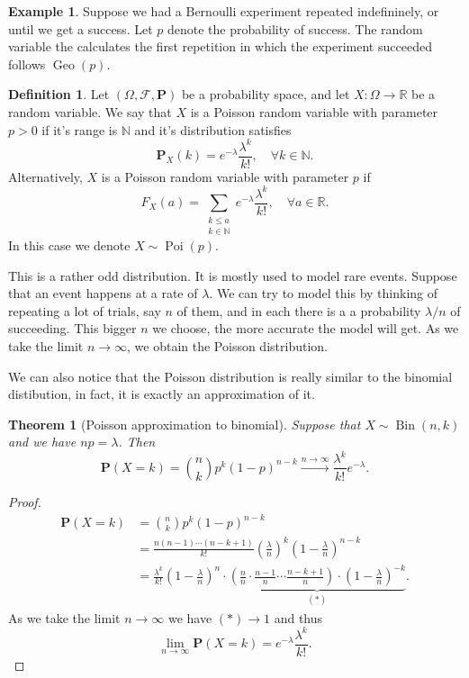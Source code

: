 \documentclass[11pt,a4paper]{article}
\theoremstyle{definition}
\newtheorem{definition}{Definition}[section]
\newtheorem{example}{Example}[section]
\theoremstyle{plain}
\newtheorem{theorem}{Theorem}[section]
\DeclareMathOperator{\Bin}{Bin}
\DeclareMathOperator{\Geo}{Geo}
\DeclareMathOperator{\Poi}{Poi}
\newcommand{\N}{\mathbb{N}}
\newcommand{\R}{\mathbb{R}}
\begin{document}
  \begin{example}
    Suppose we had a Bernoulli experiment repeated indefininely, or until
    we get a success. Let $p$ denote the probability of success.
    The random variable the calculates the first repetition in which the
    experiment succeeded follows $\Geo(p)$.
  \end{example}

  \begin{definition}
    Let $(\Omega ,\mathcal F, \mathbf P)$ be a probability space,
    and let $X \colon \Omega \to \R$ be a random variable.
    We say that $X$ is a Poisson random variable with parameter
    $p > 0$ if it's range is $\N$ and it's distribution satisfies
    \[
      \mathbf P_X(k) = e^{-\lambda} \frac{\lambda^k}{k!}, \quad 
      \forall k \in \N.
    \]
    Alternatively, $X$ is a Poisson random variable with parameter
    $p$ if
    \[
      F_X(a) = \sum_{\substack{k \le a \\ k \in \N}}
      e^{-\lambda} \frac{\lambda^k}{k!}, \quad \forall a \in \R.
    \]
    In this case we denote $X \sim \Poi(p)$.
  \end{definition}
  
  This is a rather odd distribution. It is mostly used to model rare events.
  Suppose that an event happens at a rate of $\lambda$.
  We can try to model this by thinking of repeating a lot of trials,
  say $n$ of them, and in each there is a a probability $\lambda / n$ of 
  succeeding. This bigger $n$ we choose, the more accurate the model will get.
  As we take the limit $n \to \infty$, we obtain the Poisson distribution.
  
  We can also notice that the Poisson distribution is really similar to
  the binomial distibution, in fact, it is exactly an approximation of it.

  \begin{theorem}[Poisson approximation to binomial]
    Suppose that $X \sim \Bin(n,k)$ and we have
    $np = \lambda$. Then
    \[
      \mathbf P(X = k) = 
      \binom{n}{k} p^{k} (1-p)^{n-k} \xrightarrow{n\to\infty}
      \frac{\lambda^{k}}{k!} e^{-\lambda}.
    \]
  \end{theorem}
  \begin{proof}
    \begin{align*}
      \mathbf {P}(X = k) &= 
      {\binom{n}{k}}p^{k}(1 - p)^{n - k} \\ &= 
      {\frac{n(n - 1) \cdots (n - k + 1)}{k!}} 
      \left(\frac{\lambda}{n}\right)^k
      \left(1 - {\frac{\lambda}{n}}\right)^{n-k} \\ &= 
      \frac{\lambda^{k}}{k!} \left(1-{\frac{\lambda}{n}}\right)^{n} \cdot
      \underbrace{
      \left( {\frac{n}{n}} \cdot 
      {\frac{n - 1}{n}} \cdots {\frac{n - k + 1}{n}} \right) \cdot 
      \left(1 - {\frac{\lambda}{n}}\right)^{-k}}_{(*)}.
    \end{align*}
    As we take the limit $n \to \infty$ we have $(*) \to 1$ and thus
    \[
      \lim_{n\to\infty}\mathbf{P}(X=k)=e^{-\lambda}{\frac{\lambda^{k}}{k!}}.
    \]
  \end{proof}
\end{document}
